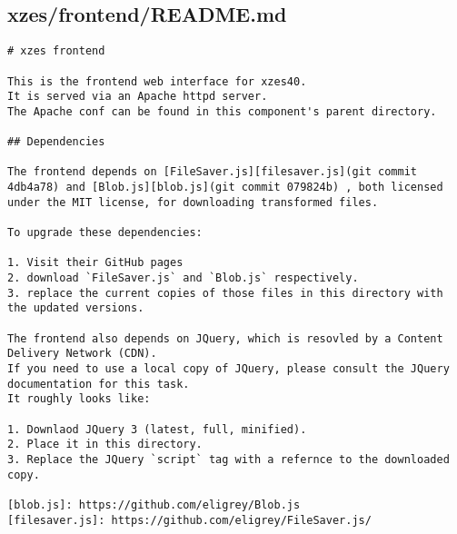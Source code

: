\subsection{xzes/frontend/README.md}
\begin{lstlisting}[caption={xzes frontend code REDME}]
# xzes frontend

This is the frontend web interface for xzes40.
It is served via an Apache httpd server.
The Apache conf can be found in this component's parent directory.

## Dependencies

The frontend depends on [FileSaver.js][filesaver.js](git commit 4db4a78) and [Blob.js][blob.js](git commit 079824b) , both licensed under the MIT license, for downloading transformed files.

To upgrade these dependencies:

1. Visit their GitHub pages
2. download `FileSaver.js` and `Blob.js` respectively.
3. replace the current copies of those files in this directory with the updated versions.

The frontend also depends on JQuery, which is resovled by a Content Delivery Network (CDN).
If you need to use a local copy of JQuery, please consult the JQuery documentation for this task.
It roughly looks like:

1. Downlaod JQuery 3 (latest, full, minified).
2. Place it in this directory.
3. Replace the JQuery `script` tag with a refernce to the downloaded copy.

[blob.js]: https://github.com/eligrey/Blob.js
[filesaver.js]: https://github.com/eligrey/FileSaver.js/
\end{lstlisting}
